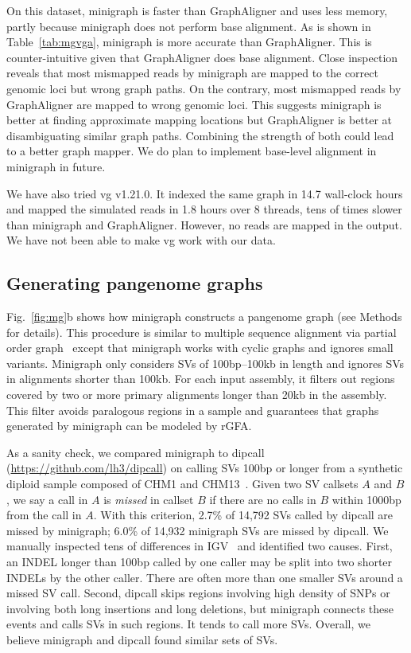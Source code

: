 \documentclass[twocolumn]{bmcart}
\begin{document}
On this dataset, minigraph
is faster than GraphAligner and uses less memory, partly because minigraph does
not perform base alignment.
As is shown in Table~\ref{tab:mgvga}, minigraph is more accurate than
GraphAligner. This is counter-intuitive given that GraphAligner does base
alignment. Close inspection reveals that most mismapped reads by minigraph are
mapped to the correct genomic loci but wrong graph paths. On the contrary, most
mismapped reads by GraphAligner are mapped to wrong genomic loci. This suggests
minigraph is better at finding approximate mapping locations but GraphAligner
is better at disambiguating similar graph paths.  Combining the strength of
both could lead to a better graph mapper. We do plan to implement base-level
alignment in minigraph in future.

We have also tried vg v1.21.0. It indexed the same graph in 14.7 wall-clock
hours and mapped the simulated reads in 1.8 hours over 8 threads, tens of times
slower than minigraph and GraphAligner. However, no reads are mapped in the
output. We have not been able to make vg work with our data.

\subsection*{Generating pangenome graphs}

Fig.~\ref{fig:mg}b shows how minigraph constructs a pangenome graph (see
Methods for details). This procedure is similar to multiple sequence alignment
via partial order graph~\cite{Lee_2002} except that minigraph works with cyclic
graphs and ignores small variants. Minigraph only considers SVs of
100bp--100kb in length and ignores SVs in alignments shorter than 100kb.
For each input assembly, it filters out regions covered by two or more primary
alignments longer than 20kb in the assembly. This filter avoids paralogous
regions in a sample and guarantees that graphs generated by minigraph can be
modeled by rGFA.

As a sanity check, we compared minigraph to dipcall
(\href{https://github.com/lh3/dipcall}{https://github.com/lh3/dipcall}) on
calling SVs 100bp or longer from a synthetic diploid sample composed of CHM1
and CHM13~\cite{Li:2018aa}. Given two SV callsets $A$ and $B$, we say a call in
$A$ is \emph{missed} in callset $B$ if there are no calls in $B$ within 1000bp
from the call in $A$. With this criterion, 2.7\% of 14,792 SVs called by
dipcall are missed by minigraph; 6.0\% of 14,932 minigraph SVs are missed by
dipcall. We manually inspected tens of differences in
IGV~\cite{Robinson:2011aa} and identified two causes. First, an INDEL longer
than 100bp called by one caller may be split into two shorter INDELs by the
other caller. There are often more than one smaller SVs around a missed SV
call. Second, dipcall skips regions involving high density of SNPs or involving
both long insertions and long deletions, but minigraph connects these events
and calls SVs in such regions. It tends to call more SVs. Overall, we believe
minigraph and dipcall found similar sets of SVs.
\end{document}
